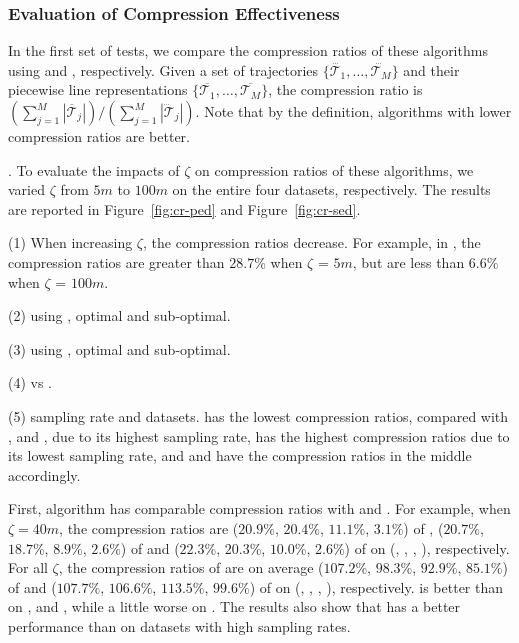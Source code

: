 \subsubsection{Evaluation of Compression Effectiveness}

In the first set of tests, we compare the compression ratios of these algorithms using \ped and \sed, respectively.
Given a set of trajectories $\{\dddot{\mathcal{T}_1}, \ldots, \dddot{\mathcal{T}_M}\}$ and their piecewise line representations
$\{\overline{\mathcal{T}_1}, \ldots, \overline{\mathcal{T}_M}\}$,
 the compression ratio is $(\sum_{j=1}^{M} |\overline{\mathcal{T}}_j |)/(\sum_{j=1}^{M} |\dddot{\mathcal{T}}_j |)$.
 Note that by the definition, algorithms with lower compression ratios are better.



.
To evaluate the impacts of $\zeta$ on compression ratios of these algorithms, we varied $\zeta$ from $5m$ to $100m$ on
 the entire four datasets, respectively.
The results are reported in Figure~\ref{fig:cr-ped} and Figure~\ref{fig:cr-sed}.

\sstab (1) When increasing $\zeta$, the compression ratios decrease. For example, in \sercar,
the compression ratios are greater than $28.7\%$ when $\zeta$ = $5m$, but are less than $6.6\%$ when $\zeta$ = $100m$.

\sstab (2) using \ped, optimal and sub-optimal.

\sstab (3) using \sed, optimal and sub-optimal.

\sstab (4) \ped vs \sed.
	
\sstab (5) sampling rate and datasets.
\geolife has the lowest compression ratios, compared with \taxi, \truck and \sercar, due to its highest sampling rate, \taxi has the highest compression ratios due to its lowest sampling rate, and \truck and \sercar have the compression ratios in the middle accordingly.

	
{First, algorithm \operb has comparable compression ratios with \fbqsa and \dpa.
For example, when $\zeta = 40m$, the compression ratios are ($20.9\%$, $20.4\%$, $11.1\%$, $3.1\%$) of \fbqsa, ($20.7\%$, $18.7\%$, $8.9\%$, $2.6\%$) of \dpa and ($22.3\%$, $20.3\%$, $10.0\%$, $2.6\%$) of \operb on (\taxi, \truck, \sercar, \geolife), respectively.
For all $\zeta$, the compression ratios of \operb are on average ($107.2\%$, $98.3\%$, $92.9\%$, {$85.1\%$}) of \fbqsa and ($107.7\%$, $106.6\%$, $113.5\%$, $99.6\%$) of \dpa on (\taxi, \truck, \sercar, \geolife), respectively.
\operb is better than  \fbqsa on \truck, \sercar and \geolife, while a little worse on \taxi. The results also show that \operb has a better performance than \fbqsa on datasets with high sampling rates.}

